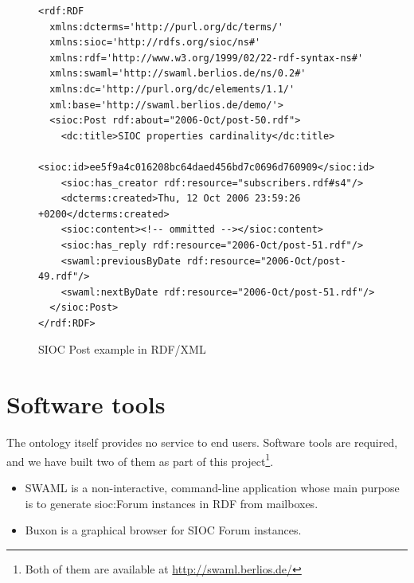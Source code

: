 \documentclass{llncs}
\begin{document}
\begin{figure}[ht]
\lstset{language=RDF}
\begin{lstlisting}
<rdf:RDF
  xmlns:dcterms='http://purl.org/dc/terms/'
  xmlns:sioc='http://rdfs.org/sioc/ns#'
  xmlns:rdf='http://www.w3.org/1999/02/22-rdf-syntax-ns#'
  xmlns:swaml='http://swaml.berlios.de/ns/0.2#'
  xmlns:dc='http://purl.org/dc/elements/1.1/'
  xml:base='http://swaml.berlios.de/demo/'>
  <sioc:Post rdf:about="2006-Oct/post-50.rdf">
    <dc:title>SIOC properties cardinality</dc:title>
    <sioc:id>ee5f9a4c016208bc64daed456bd7c0696d760909</sioc:id>
    <sioc:has_creator rdf:resource="subscribers.rdf#s4"/>
    <dcterms:created>Thu, 12 Oct 2006 23:59:26 +0200</dcterms:created>
    <sioc:content><!-- ommitted --></sioc:content>
    <sioc:has_reply rdf:resource="2006-Oct/post-51.rdf"/>
    <swaml:previousByDate rdf:resource="2006-Oct/post-49.rdf"/>
    <swaml:nextByDate rdf:resource="2006-Oct/post-51.rdf"/>
  </sioc:Post>
</rdf:RDF>
\end{lstlisting}
\caption{SIOC Post example in RDF/XML}
\label{fig:rdfexample}
\end{figure}

\section{\label{sec:tools}Software tools}

The ontology itself provides no service to end users. Software tools
are required, and we have built two of them as part of this
project\footnote{Both of them are available at \url{http://swaml.berlios.de/}}.

\begin{itemize}
  \item SWAML is a non-interactive, command-line application whose main
	purpose is to generate \textsf{sioc:Forum} instances in RDF from
	mailboxes.
  \item Buxon is a graphical browser for SIOC \textsf{Forum} instances.
\end{itemize}
\end{document}
